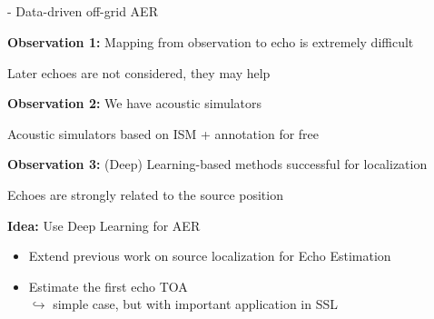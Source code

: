 
\subsection{\lantern}

\begin{frame}{\lantern - Data-driven off-grid AER}

    \begin{block}{\textbf{Observation 1:} Mapping from observation to echo is extremely difficult}

        \vspace{.1em}
        Later echoes are not considered, they may help
    \end{block}
    \pause

    \begin{block}{\textbf{Observation 2:} We have acoustic simulators}

        \vspace{.1em}
        Acoustic simulators based on ISM + annotation for free
    \end{block}
    \pause

    \begin{block}{\textbf{Observation 3:} (Deep) Learning-based methods successful for localization}

        \vspace{.1em}
        Echoes are strongly related to the source position
    \end{block}
    \pause

    \begin{alertblock}{\textbf{Idea:} Use Deep Learning for AER}
        \begin{itemize}
            \item Extend previous work on source localization for Echo Estimation
            \item Estimate the first echo TOA
            \\$\hookrightarrow$ simple case, but with important application in SSL
        \end{itemize}
    \end{alertblock}

\end{frame}

